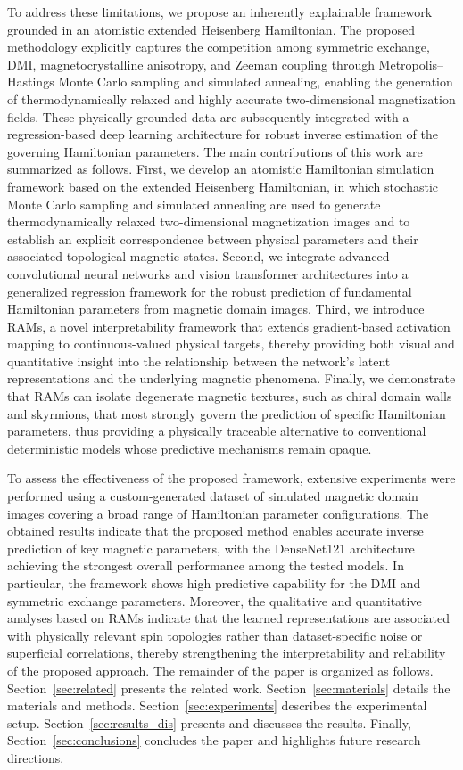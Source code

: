 \documentclass[a4paper,fleqn]{cas-sc}
\begin{document}
To address these limitations, we propose an inherently explainable framework grounded in an atomistic extended Heisenberg Hamiltonian. The proposed methodology explicitly captures the competition among symmetric exchange, DMI, magnetocrystalline anisotropy, and Zeeman coupling through Metropolis–Hastings Monte Carlo sampling and simulated annealing, enabling the generation of thermodynamically relaxed and highly accurate two-dimensional magnetization fields. These physically grounded data are subsequently integrated with a regression-based deep learning architecture for robust inverse estimation of the governing Hamiltonian parameters. The main contributions of this work are summarized as follows. First, we develop an atomistic Hamiltonian simulation framework based on the extended Heisenberg Hamiltonian, in which stochastic Monte Carlo sampling and simulated annealing are used to generate thermodynamically relaxed two-dimensional magnetization images and to establish an explicit correspondence between physical parameters and their associated topological magnetic states. Second, we integrate advanced convolutional neural networks and vision transformer architectures into a generalized regression framework for the robust prediction of fundamental Hamiltonian parameters from magnetic domain images. Third, we introduce RAMs, a novel interpretability framework that extends gradient-based activation mapping to continuous-valued physical targets, thereby providing both visual and quantitative insight into the relationship between the network’s latent representations and the underlying magnetic phenomena. Finally, we demonstrate that RAMs can isolate degenerate magnetic textures, such as chiral domain walls and skyrmions, that most strongly govern the prediction of specific Hamiltonian parameters, thus providing a physically traceable alternative to conventional deterministic models whose predictive mechanisms remain opaque.

To assess the effectiveness of the proposed framework, extensive experiments were performed using a custom-generated dataset of simulated magnetic domain images covering a broad range of Hamiltonian parameter configurations. The obtained results indicate that the proposed method enables accurate inverse prediction of key magnetic parameters, with the DenseNet121 architecture achieving the strongest overall performance among the tested models. In particular, the framework shows high predictive capability for the DMI and symmetric exchange parameters. Moreover, the qualitative and quantitative analyses based on RAMs indicate that the learned representations are associated with physically relevant spin topologies rather than dataset-specific noise or superficial correlations, thereby strengthening the interpretability and reliability of the proposed approach. The remainder of the paper is organized as follows. Section~\ref{sec:related} presents the related work. Section~\ref{sec:materials} details the materials and methods. Section~\ref{sec:experiments} describes the experimental setup. Section~\ref{sec:results_dis} presents and discusses the results. Finally, Section~\ref{sec:conclusions} concludes the paper and highlights future research directions.
\end{document}
